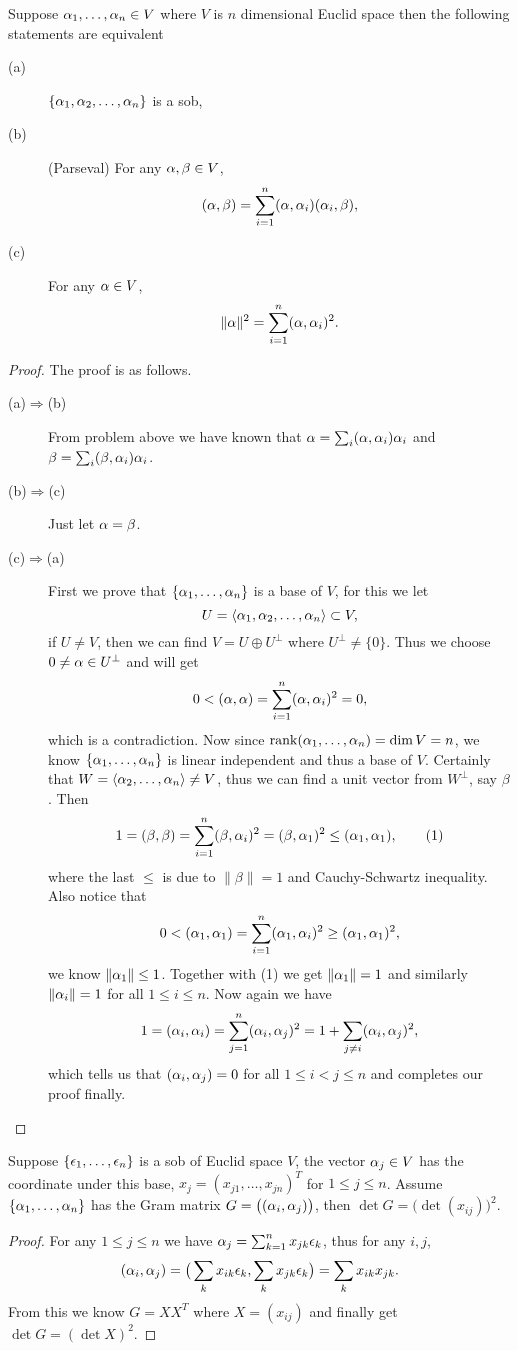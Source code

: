 \begin{pro}%
	Suppose $\alpha_1,\dots,\alpha_n\in V$ where $V$ is $n$ dimensional Euclid space then the following statements are equivalent
	\begin{description}
	\item[(a)] $\{\alpha_1,\alpha_2,\dots,\alpha_n\}$ is a sob,
	\item[(b)] (Parseval) For any $\alpha,\beta\in V$,
	\[(\alpha,\beta)=\sum_{i=1}^n (\alpha,\alpha_i)(\alpha_i,\beta),\]
	\item[(c)] For any $\alpha\in V$,
	\[\|\alpha\|^2=\sum_{i=1}^n (\alpha,\alpha_i)^2.\]
	\end{description}
\end{pro}
\begin{proof}
	The proof is as follows.
	\begin{description}
	\item[(a)$\Rightarrow$(b)] From problem above we have known that $\alpha=\sum_i (\alpha,\alpha_i)\alpha_i$ and $\beta=\sum_i(\beta,\alpha_i)\alpha_i$.
	\item[(b)$\Rightarrow$(c)] Just let $\alpha=\beta$.
	\item[(c)$\Rightarrow$(a)] First we prove that $\{\alpha_1,\dots,\alpha_n\}$ is a base of $V$, for this we let 
	\[U=\left\langle \alpha_1,\alpha_2,\dots,\alpha_n\right\rangle\subset V,\]
	if $U\neq V$, then we can find $V=U\oplus U^{\perp}$ where $U^{\perp}\neq \{0\}$. Thus we choose $0\neq \alpha\in U^{\perp}$ and will get
	\[0<(\alpha,\alpha)=\sum_{i=1}^n (\alpha,\alpha_i)^2=0,\]
	which is a contradiction. Now since $\operatorname*{rank}(\alpha_1,\dots,\alpha_n)=\dim V=n$, we know $\{\alpha_1,\dots,\alpha_n\}$ is linear independent and thus a base of $V$. Certainly that $W=\left\langle \alpha_2,\dots,\alpha_n\right\rangle\neq V$, thus we can find a unit vector from $W^{\perp}$, say $\beta$. Then 
	\[1=(\beta,\beta)=\sum_{i=1}^n (\beta,\alpha_i)^2=(\beta,\alpha_1)^2\leq (\alpha_1,\alpha_1),\tag{1}\]
	where the last $\leq$ is due to $\|\beta\|=1$ and Cauchy-Schwartz inequality. Also notice that 
	\[0<(\alpha_1,\alpha_1)=\sum_{i=1}^n (\alpha_1,\alpha_i)^2\geq (\alpha_1,\alpha_1)^2,\]
	we know $\|\alpha_1\|\leq 1$. Together with (1) we get $\|\alpha_1\|=1$ and similarly $\|\alpha_i\|=1$ for all $1\leq i\leq n$. Now again we have 
	\[1=(\alpha_i,\alpha_i)=\sum_{j=1}^n (\alpha_i,\alpha_j)^2=1+\sum_{j\neq i}(\alpha_i,\alpha_j)^2,\]
	which tells us that $(\alpha_i,\alpha_j)=0$ for all $1\leq i<j\leq n$ and completes our proof finally.
	\end{description}
\end{proof}

\begin{pro}%
	Suppose $\{\epsilon_1,\dots,\epsilon_n\}$ is a sob of Euclid space $V$, the vector $\alpha_j\in V$ has the coordinate under this base, $x_j=(x_{j1},\dots,x_{jn})^T$ for $1\leq j\leq n$. Assume $\{\alpha_1,\dots,\alpha_n\}$ has the Gram matrix $G=\big((\alpha_i,\alpha_j)\big)$, then $\det G=\big(\det(x_{ij})\big)^2$.
\end{pro}
\begin{proof}
	For any $1\leq j\leq n$ we have $\alpha_j=\sum_{k=1}^n x_{jk}\epsilon_k$, thus for any $i,j$,
	\[(\alpha_i,\alpha_j)=\big(\sum_k x_{ik}\epsilon_k,\sum_k x_{jk}\epsilon_k\big)=\sum_k x_{ik}x_{jk}.\]
	From this we know $G=XX^T$ where $X=(x_{ij})$ and finally get $\det G=(\det X)^2$.
\end{proof}

